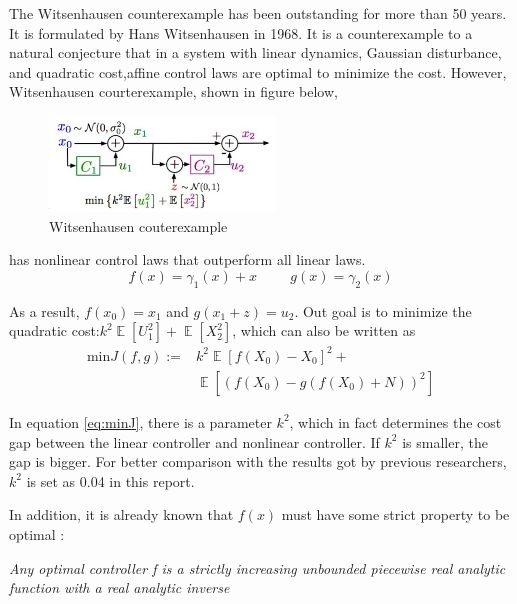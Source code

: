\documentclass[conference,compsoc]{IEEEtran}
\DeclareMathOperator{\E}{\mathbb{E}}
\begin{document}
The Witsenhausen counterexample has been outstanding for more than 50 years. It is formulated by Hans Witsenhausen in 1968.\cite{witsenhausen1968counterexample} It is a counterexample to a natural conjecture that in a system with linear dynamics, Gaussian disturbance, and quadratic cost,affine control laws are optimal to minimize the cost. However, Witsenhausen courterexample, shown in figure below,
\begin{figure}[htp]
    \centering
    \includegraphics[width=6cm]{images/Wits_definition.png}
    \caption{Witsenhausen couterexample}
    \label{fig:definition}
\end{figure}
has nonlinear control laws that outperform all linear laws.
\begin{equation}
    f(x)=\gamma_1(x)+x \hspace{1cm} g(x)=\gamma_2(x)
\end{equation}

As a result, $f(x_0)=x_1$ and $g(x_1+z)=u_2$. Out goal is to minimize the quadratic cost:$k^{2} \E [U_1^{2}]+\E[X_2^{2}]$, which can also be written as 
\begin{equation}\label{eq:minJ}
\begin{aligned}
\mathrm{min}J(f,g):=&k^{2}\E[f(X_0)-X_0]^{2}+\\
&\E[(f(X_0)-g(f(X_0)+N))^{2}]
\end{aligned}
\end{equation}

In equation \eqref{eq:minJ}, there is a parameter $k^2$, which in fact determines the cost gap between the linear controller and nonlinear controller\cite{baglietto2001numerical}. If $k^2$ is smaller, the gap is bigger. For better comparison with the results got by previous researchers, $k^2$ is set as 0.04 in this report.

In addition, it is already known that $f(x)$ must have some strict property to be optimal \cite{wu2011witsenhausen} :
\begin{adjustwidth}{0.5cm}{}
\textbullet \quad \textit{Any optimal controller f is a strictly increasing unbounded piecewise real analytic function with a real analytic inverse}
\end{adjustwidth}
\end{document}
